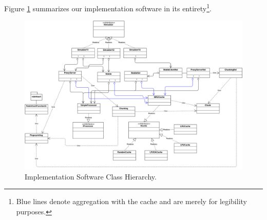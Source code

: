 Figure \ref{fig:class_diagram} summarizes our implementation software in its entirety\footnote{Blue lines denote aggregation with the cache and are merely for legibility purposes.}.

\begin{figure}[ht] \centering \includegraphics[scale=0.3]{images/class_diagram.png}
\caption{Implementation Software Class Hierarchy.}
\label{fig:class_diagram}
\end{figure}




